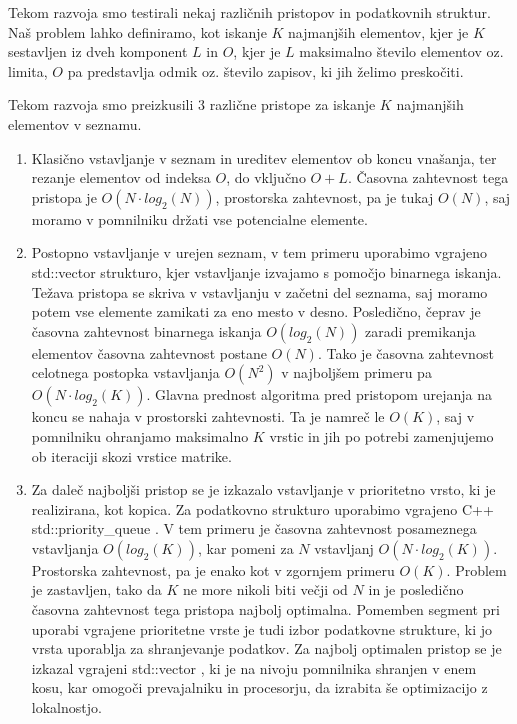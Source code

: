 \documentclass[a4paper,12pt,openright]{book}
\begin{document}
        Tekom razvoja smo testirali nekaj različnih pristopov in podatkovnih struktur. Naš problem lahko definiramo, kot iskanje $K$ najmanjših elementov, kjer je $K$ sestavljen iz dveh komponent $L$ in $O$, kjer je $L$ maksimalno število elementov oz. limita, $O$ pa predstavlja odmik oz. število zapisov, ki jih želimo preskočiti.

        Tekom razvoja smo preizkusili 3 različne pristope za iskanje $K$ najmanjših elementov v seznamu.

        \begin{enumerate}
            \item Klasično vstavljanje v seznam in ureditev elementov ob koncu vnašanja, ter rezanje elementov od indeksa $O$, do vključno $O+L$. Časovna zahtevnost tega pristopa je $O(N \cdot log_2(N))$, prostorska zahtevnost, pa je tukaj $O(N)$, saj moramo v pomnilniku držati vse potencialne elemente.
            \item Postopno vstavljanje v urejen seznam, v tem primeru uporabimo vgrajeno std::vector \cite{CPP_VECTOR} strukturo, kjer vstavljanje izvajamo s pomočjo binarnega iskanja. Težava pristopa se skriva v vstavljanju v začetni del seznama, saj moramo potem vse elemente zamikati za eno mesto v desno. Posledično, čeprav je časovna zahtevnost binarnega iskanja $O(log_2(N))$ zaradi premikanja elementov časovna zahtevnost postane $O(N)$. Tako je časovna zahtevnost celotnega postopka vstavljanja $O(N^2)$ v najboljšem primeru pa $O(N \cdot log_2(K))$. Glavna prednost algoritma pred pristopom urejanja na koncu se nahaja v prostorski zahtevnosti. Ta je namreč le $O(K)$, saj v pomnilniku ohranjamo maksimalno $K$ vrstic in jih po potrebi zamenjujemo ob iteraciji skozi vrstice matrike.
            \item Za daleč najboljši pristop se je izkazalo vstavljanje v prioritetno vrsto, ki je realizirana, kot kopica. Za podatkovno strukturo uporabimo vgrajeno C++ std::priority\_queue \cite{CPP_PQUEUE}. V tem primeru je časovna zahtevnost posameznega vstavljanja $O(log_2(K))$, kar pomeni za $N$ vstavljanj $O(N \cdot log_2(K))$. Prostorska zahtevnost, pa je enako kot v zgornjem primeru $O(K)$. Problem je zastavljen, tako da $K$ ne more nikoli biti večji od $N$ in je posledično časovna zahtevnost tega pristopa najbolj optimalna. Pomemben segment pri uporabi vgrajene prioritetne vrste je tudi izbor podatkovne strukture, ki jo vrsta uporablja za shranjevanje podatkov. Za najbolj optimalen pristop se je izkazal vgrajeni std::vector \cite{CPP_VECTOR}, ki je na nivoju pomnilnika shranjen v enem kosu, kar omogoči prevajalniku in procesorju, da izrabita še optimizacijo z lokalnostjo.
        \end{enumerate}
\end{document}
